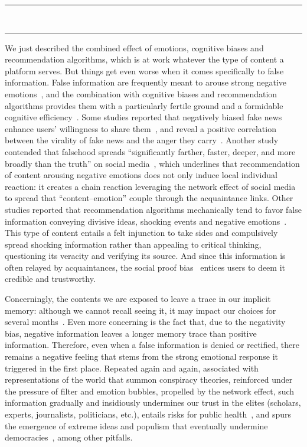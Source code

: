 \documentclass[10pt]{article}
\newcommand*\sepline{%
  \begin{center}
    \rule[1ex]{.17\textwidth}{.5pt}~{\LARGE\ding{104}}~\rule[1ex]{.17\textwidth}{.5pt}
  \end{center}}
\begin{document}
\sepline

We just described the combined effect of emotions, cognitive biases and recommendation algorithms, which is at work whatever the type of content a platform serves.
But things get even worse when it comes specifically to false information.
%
False information are frequently meant to arouse strong negative emotions~\cite{zaeem_sentiment_2020}, and the combination with cognitive biases and recommendation algorithms provides them with a particularly fertile ground and a formidable cognitive efficiency~\cite{acerbi_cognitive_2019,martel_reliance_2020}.
Some studies reported that negatively biased fake news enhance users' willingness to share them~\cite{corbu_fake_2021}, and reveal a positive correlation between the virality of fake news and the anger they carry~\cite{chuai_anger_2022}.
Another study contended that falsehood spreads ``significantly farther, faster, deeper, and more broadly than the truth'' on social media~\cite{vosoughi_spread_2018}, which underlines that recommendation of content arousing negative emotions does not only induce local individual reaction: it creates a chain reaction leveraging the network effect of social media to spread that ``content--emotion'' couple through the acquaintance links.
Other studies reported that recommendation algorithms mechanically tend to favor false information conveying divisive ideas, shocking events and negative emotions~\cite{fernandez_analysing_2021,fortunato_social_2022}.
%
This type of content entails a felt injunction to take sides and compulsively spread shocking information rather than appealing to critical thinking, questioning its veracity and verifying its source.
And since this information is often relayed by acquaintances, the social proof bias~\cite{Cialdini_2008} entices users to deem it credible and trustworthy.

Concerningly, the contents we are exposed to leave a trace in our implicit memory: although we cannot recall seeing it, it may impact our choices for several months~\cite{jcc4.12035}.
Even more concerning is the fact that, due to the negativity bias, negative information leaves a longer memory trace than positive information. Therefore, even when a false information is denied or rectified, there remains a negative feeling that stems from the strong emotional response it triggered in the first place.
Repeated again and again, associated with representations of the world that summon conspiracy theories, reinforced under the pressure of filter and emotion bubbles, propelled by the network effect, such information gradually and insidiously undermines our trust in the elites (scholars, experts, journalists, politicians, etc.), entails risks for public health~\cite{waszak_spread_2018,rocha_impact_2023}, and spurs the emergence of extreme ideas and populism that eventually undermine democracies~\cite{whittaker_recommender_2021,abreu_algorithm-driven_2021,intelligence_social_2022,fortunato_social_2022}, among other pitfalls.
\end{document}
